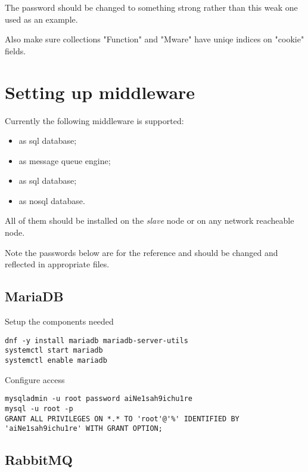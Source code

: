 The password should be changed to something strong rather than
this weak one used as an example.

Also make sure collections "Function" and "Mware" have uniqe indices
on "cookie" fields.

\section{Setting up middleware}
\label{sec:setup-mware}

Currently the following middleware is supported:
\begin{itemize}
\item{ as sql database;}
\item{ as message queue engine;}
\item{ as sql database;}
\item{ as nosql database.}
\end{itemize}

All of them should be installed on the \emph{slave} node or on any
network reacheable node.

Note the passwords below are for the reference and should be changed
and reflected in appropriate  files.

\subsection{MariaDB}
\label{subsec:setup-mware-mariadb}

Setup the components needed

\begin{lstlisting}
dnf -y install mariadb mariadb-server-utils
systemctl start mariadb
systemctl enable mariadb
\end{lstlisting}

Configure access

\begin{lstlisting}
mysqladmin -u root password aiNe1sah9ichu1re
mysql -u root -p
GRANT ALL PRIVILEGES ON *.* TO 'root'@'%' IDENTIFIED BY 'aiNe1sah9ichu1re' WITH GRANT OPTION;
\end{lstlisting}

\subsection{RabbitMQ}
\label{subsec:setup-mware-rabbitmq}


